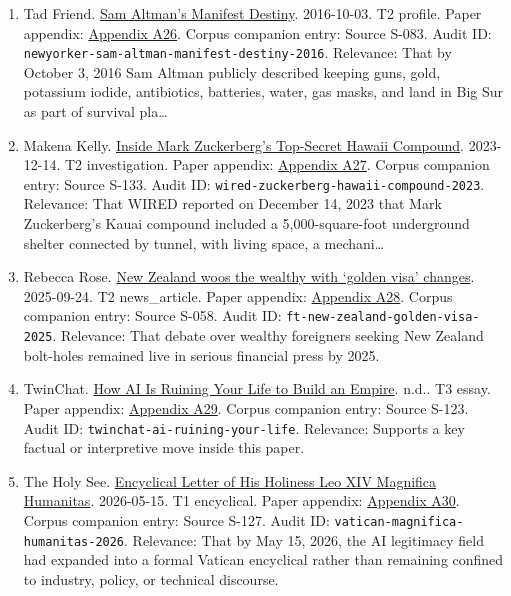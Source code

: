 \documentclass[
  american,
  11pt,
  letterpaper,
]{article}
\begin{document}
\begin{enumerate}
{  A25}. Corpus companion entry: Source S-010. Audit ID:
  \texttt{ap-ftc-ai-partnerships-inquiry-2024}. Relevance: That formal
  competition scrutiny of frontier-AI partnerships was already underway
  in the United States by January 2024.
\item
  Tad Friend.
  \href{https://www.newyorker.com/magazine/2016/10/10/sam-altmans-manifest-destiny}{Sam
  Altman's Manifest Destiny}. 2016-10-03. T2 profile. Paper appendix:
  \hyperref[appendix-a26-sam-altman-s-manifest-destiny]{Appendix A26}.
  Corpus companion entry: Source S-083. Audit ID:
  \texttt{newyorker-sam-altman-manifest-destiny-2016}. Relevance: That
  by October 3, 2016 Sam Altman publicly described keeping guns, gold,
  potassium iodide, antibiotics, batteries, water, gas masks, and land
  in Big Sur as part of survival pla\ldots{}
\item
  Makena Kelly.
  \href{https://www.wired.com/story/mark-zuckerberg-inside-hawaii-compound}{Inside
  Mark Zuckerberg's Top-Secret Hawaii Compound}. 2023-12-14. T2
  investigation. Paper appendix:
  \hyperref[appendix-a27-inside-mark-zuckerbergs-top-secret-hawaii-compound]{Appendix
  A27}. Corpus companion entry: Source S-133. Audit ID:
  \texttt{wired-zuckerberg-hawaii-compound-2023}. Relevance: That WIRED
  reported on December 14, 2023 that Mark Zuckerberg's Kauai compound
  included a 5,000-square-foot underground shelter connected by tunnel,
  with living space, a mechani\ldots{}
\item
  Rebecca Rose.
  \href{https://www.ft.com/content/76ca455c-3b16-4413-8738-3f17431d125b}{New
  Zealand woos the wealthy with `golden visa' changes}. 2025-09-24. T2
  news\_article. Paper appendix:
  \hyperref[appendix-a28-new-zealand-woos-the-wealthy-with-golden-visa-changes]{Appendix
  A28}. Corpus companion entry: Source S-058. Audit ID:
  \texttt{ft-new-zealand-golden-visa-2025}. Relevance: That debate over
  wealthy foreigners seeking New Zealand bolt-holes remained live in
  serious financial press by 2025.
\item
  TwinChat.
  \href{https://medium.com/twinchat/how-ai-is-ruining-your-life-to-build-an-empire-8b6d02e55bc9}{How
  AI Is Ruining Your Life to Build an Empire}. n.d.. T3 essay. Paper
  appendix:
  \hyperref[appendix-a29-how-ai-is-ruining-your-life-to-build-an-empire]{Appendix
  A29}. Corpus companion entry: Source S-123. Audit ID:
  \texttt{twinchat-ai-ruining-your-life}. Relevance: Supports a key
  factual or interpretive move inside this paper.
\item
  The Holy See.
  \href{https://www.vatican.va/content/leo-xiv/en/encyclicals/documents/20260515-magnifica-humanitas.html}{Encyclical
  Letter of His Holiness Leo XIV Magnifica Humanitas}. 2026-05-15. T1
  encyclical. Paper appendix:
  \hyperref[appendix-a30-encyclical-letter-of-his-holiness-leo-xiv-magnifica-humanitas]{Appendix
  A30}. Corpus companion entry: Source S-127. Audit ID:
  \texttt{vatican-magnifica-humanitas-2026}. Relevance: That by May 15,
  2026, the AI legitimacy field had expanded into a formal Vatican
  encyclical rather than remaining confined to industry, policy, or
  technical discourse.
\end{enumerate}
\end{document}
